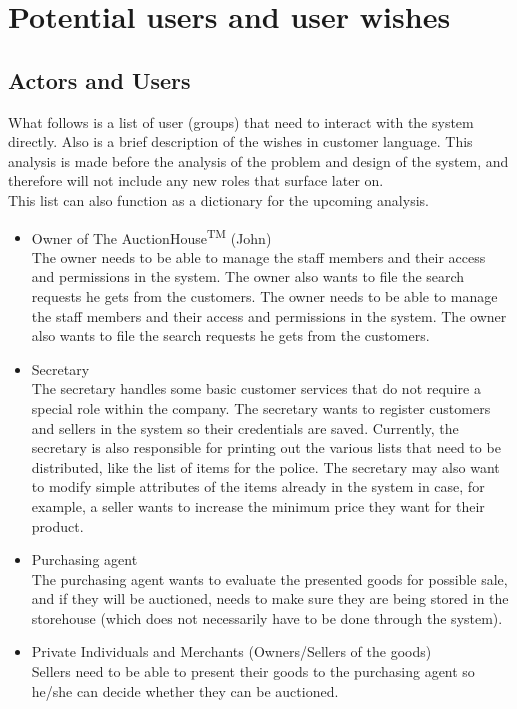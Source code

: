 \section{Potential users and user wishes}
\subsection{Actors and Users}
What follows is a list of user (groups) that need to interact with the system directly. Also is a brief description of the wishes in customer language. This analysis is made before the analysis of the problem and design of the system, and therefore will not include any new roles that surface later on.\\
This list can also function as a dictionary for the upcoming analysis.
\begin{itemize}[noitemsep]
	\item Owner of The AuctionHouse\textsuperscript{TM} (John)\\
		The owner needs to be able to manage the staff members and their access and permissions in the system. The owner also wants to file the search requests he gets from the customers.
		The owner needs to be able to manage the staff members and their access and permissions in the system. The owner also wants to file the search requests he gets from the customers.
	\item Secretary\\
		The secretary handles some basic customer services that do not require a special role within the company. The secretary wants to register customers and sellers in the system so their credentials are saved. Currently, the secretary is also responsible for printing out the various lists that need to be distributed, like the list of items for the police. The secretary may also want to modify simple attributes of the items already in the system in case, for example, a seller wants to increase the minimum price they want for their product.
	\item Purchasing agent\\
		The purchasing agent wants to evaluate the presented goods for possible sale, and if they will be auctioned, needs to make sure they are being stored in the storehouse (which does not necessarily have to be done through the system).
	\item Private Individuals and Merchants (Owners/Sellers of the goods)\\
		Sellers need to be able to present their goods to the purchasing agent so he/she can decide whether they can be auctioned.

\end{itemize}
